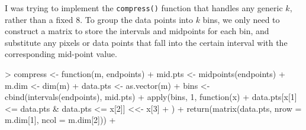 \begin{enumerate}[(a)]
    I was trying to implement the \verb=compress()= function that handles any generic $k$, rather than a fixed $8$. 
    To group the data points into $k$ bins, we only need to construct a matrix to store the intervals and midpoints for each bin, and substitute any pixels or data points that fall into the certain interval with the corresponding mid-point value.
\begin{Schunk}
\begin{Sinput}
> compress <- function(m, endpoints) {
+     mid.pts <- midpoints(endpoints)
+     m.dim <- dim(m)
+     data.pts <- as.vector(m)
+     bins <- cbind(intervals(endpoints), mid.pts)
+     apply(bins, 1, function(x) {
+         data.pts[x[1] <= data.pts & data.pts <= x[2]] <<- x[3]
+     })
+     return(matrix(data.pts, nrow = m.dim[1], ncol = m.dim[2]))
+ }
\end{Sinput}
\end{Schunk}
    

\end{enumerate}
